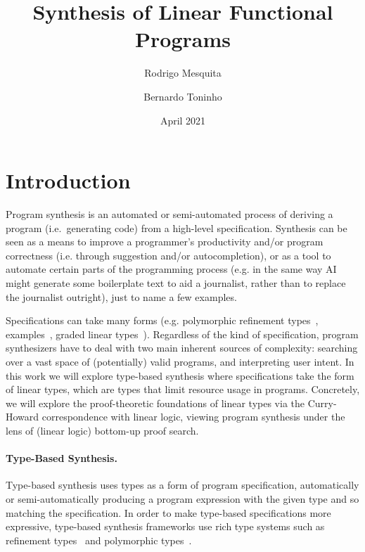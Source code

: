 \documentclass{llncs}
\title{Synthesis of Linear Functional Programs}
\author{Rodrigo Mesquita \and Bernardo Toninho}
\date{April 2021}
\institute{NOVA School of Science and Technology}
\newcommand{\mypara}[1]{\paragraph{\textbf{#1}.}}
\begin{document}
\maketitle

\section{Introduction}

Program synthesis is an automated or semi-automated process of
deriving a program (i.e.~generating code) from a high-level
specification.  
%
Synthesis can be seen as a means to improve a programmer's
productivity and/or program correctness (i.e. through suggestion
and/or autocompletion), or as a tool to automate certain parts of the
programming process (e.g. in the same way AI might generate some
boilerplate text to aid a journalist, rather than to replace the
journalist outright), just to name a few examples.

Specifications can take many forms (e.g.  polymorphic refinement
types~\cite{DBLP:conf/pldi/PolikarpovaKS16},
examples~\cite{DBLP:conf/popl/FrankleOWZ16}, graded linear
types~\cite{DBLP:conf/lopstr/HughesO20}).  Regardless of the kind
of specification, program synthesizers have to deal with two main
inherent sources of complexity: searching over a vast space of
(potentially) valid programs, and interpreting user intent.
%
In this work we will explore type-based synthesis where specifications
take the form of linear types, which are types that limit resource
usage in programs.  Concretely, we will explore the proof-theoretic
foundations of linear types via the Curry-Howard correspondence with
linear logic, viewing program synthesis under the lens of (linear
logic) bottom-up proof search.

%

\mypara{Type-Based Synthesis}
Type-based synthesis uses types as a form of program specification,
automatically or semi-automatically producing a program expression
with the given type and so matching the specification.
%
In order to make type-based specifications more expressive, type-based
synthesis frameworks use rich type systems such as refinement
types~\cite{DBLP:conf/pldi/PolikarpovaKS16} and polymorphic types~\cite{DBLP:conf/pldi/PolikarpovaKS16}.
\end{document}
